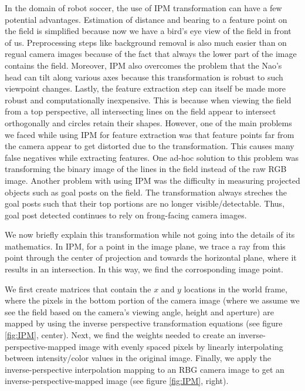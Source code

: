 \documentclass[	DIV=calc,%
							paper=a4,%
							fontsize=9pt,%
							twocolumn]{scrartcl}	 					%
\begin{document}
In the domain of robot soccer, the use of IPM transformation can have a few potential advantages. %
Estimation of distance and bearing to a feature point on the field is simplified because now we have a bird's eye view of the field in front of us. Preprocessing steps like background removal is also much easier than on regual camera images because of the fact that always the lower part of the image contains the field. Moreover, IPM also overcomes the problem that the Nao's head can tilt along various axes because this transformation is robust to such viewpoint changes. Lastly, the feature extraction step can itself be made more robust and computationally inexpensive. This is because when viewing the field from a top perspective, all intersecting lines on the field appear to intersect orthogonally and circles retain their shapes. However, one of the main problems we faced while using IPM for feature extraction was that feature points far from the camera appear to get distorted due to the transformation. This causes many false negatives while extracting features. One ad-hoc solution to this problem was transforming the binary image of the lines in the field instead of the raw RGB image. Another problem with using IPM was the difficulty in measuring projected objects such as goal posts on the field. The transformation always streches the goal posts such that their top portions are no longer visible/detectable. Thus, goal post detected continues to rely on frong-facing camera images.

We now briefly explain this transformation\cite{IPM} while not going into the details of its mathematics. In IPM, for a point in the image plane, we trace a ray from this point through the center of projection and towards the horizontal plane, where it results in an intersection. In this way, we find the corrosponding image point.

We first create matrices that contain the $x$ and $y$ locations in the world frame, where the pixels in the bottom portion of the camera image (where we assume we see the field based on the camera's viewing angle, height and aperture) are mapped by using the inverse perspective transformation equations (see figure \ref{fig:IPM}, center). Next, we find the weights needed to create an inverse-perspective-mapped image with evenly spaced pixels by linearly interpolating between intensity/color values in the original image. Finally, we apply the inverse-perspective interpolation mapping to an RBG camera image to get an inverse-perspective-mapped image\cite{IPMCode} (see figure \ref{fig:IPM}, right).
\end{document}
